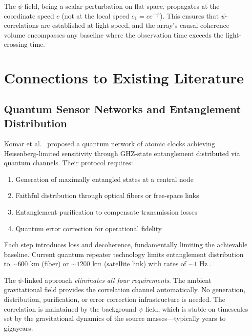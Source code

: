 \documentclass[12pt,a4paper]{article}
\theoremstyle{remark}
\begin{document}
The $\psi$ field, being a scalar perturbation on flat space, propagates
at the coordinate speed $c$ (not at the local speed $c_1 = ce^{-\psi}$).
This ensures that $\psi$-correlations are established at light speed,
and the array's causal coherence volume encompasses any baseline where
the observation time exceeds the light-crossing time.


\section{Connections to Existing Literature}\label{sec:literature}

\subsection{Quantum Sensor Networks and Entanglement Distribution}

Komar et al.\ \cite{Komar2014} proposed a quantum network of atomic
clocks achieving Heisenberg-limited sensitivity through GHZ-state
entanglement distributed via quantum channels. Their protocol requires:
\begin{enumerate}
\item Generation of maximally entangled states at a central node
\item Faithful distribution through optical fibers or free-space links
\item Entanglement purification to compensate transmission losses
\item Quantum error correction for operational fidelity
\end{enumerate}

Each step introduces loss and decoherence, fundamentally limiting the
achievable baseline. Current quantum repeater technology limits entanglement
distribution to $\sim 600$ km (fiber) or $\sim 1200$ km (satellite link)
with rates of $\sim 1$ Hz \cite{Yin2017,Chen2021}.

The $\psi$-linked approach \emph{eliminates all four requirements}. The
ambient gravitational field provides the correlation channel automatically.
No generation, distribution, purification, or error correction infrastructure
is needed. The correlation is maintained by the background $\psi$ field,
which is stable on timescales set by the gravitational dynamics of the
source masses---typically years to gigayears.
\end{document}
